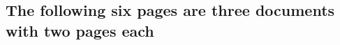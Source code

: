 \newpage
\begin{appendices}
\chapter{The following six pages are three documents with two pages each}



\end{appendices}